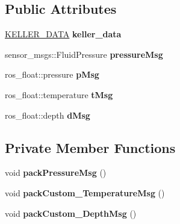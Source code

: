 \subsection*{Public Attributes}
\begin{DoxyCompactItemize}
\item 
\mbox{\label{classKeller__reader_a2d73223c9cae72b889f1d121e2f629d5}} 
\hyperlink{structKELLER__DATA}{K\+E\+L\+L\+E\+R\+\_\+\+D\+A\+TA} {\bfseries keller\+\_\+data}
\item 
\mbox{\label{classKeller__reader_a9c2c2985184a95c46f106c1e549340c0}} 
sensor\+\_\+msgs\+::\+Fluid\+Pressure {\bfseries pressure\+Msg}
\item 
\mbox{\label{classKeller__reader_a4ef560019ef100b52d6fd46b497a84eb}} 
ros\+\_\+float\+::pressure {\bfseries p\+Msg}
\item 
\mbox{\label{classKeller__reader_aca76ed46c7e828e131c99df919dee597}} 
ros\+\_\+float\+::temperature {\bfseries t\+Msg}
\item 
\mbox{\label{classKeller__reader_a9216da4b4ba9d3aab90a8d59e9cd9d93}} 
ros\+\_\+float\+::depth {\bfseries d\+Msg}
\end{DoxyCompactItemize}
\subsection*{Private Member Functions}
\begin{DoxyCompactItemize}
\item 
\mbox{\label{classKeller__reader_a1447efaa0ca4da10c05aadfed883a07d}} 
void {\bfseries pack\+Pressure\+Msg} ()
\item 
\mbox{\label{classKeller__reader_a2c5b455f877fbca9ae2af0891991d948}} 
void {\bfseries pack\+Custom\+\_\+\+Temperature\+Msg} ()
\item 
\mbox{\label{classKeller__reader_aec80d676479ec7193b5070e57450bf32}} 
void {\bfseries pack\+Custom\+\_\+\+Depth\+Msg} ()
\end{DoxyCompactItemize}
